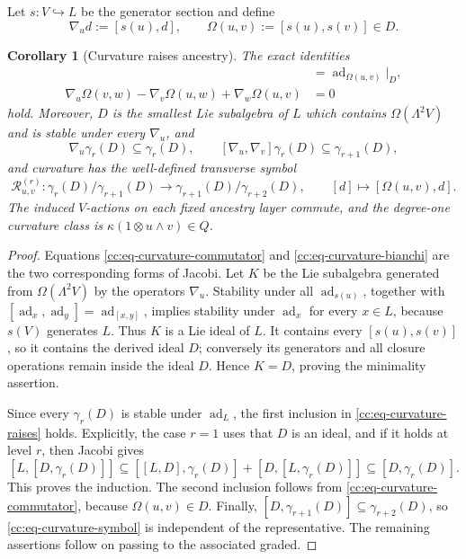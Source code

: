 \documentclass[10pt,reqno]{amsart}
\theoremstyle{plain}
\newtheorem{corollary}[theorem]{Corollary}
\theoremstyle{definition}
\theoremstyle{remark}
\begin{document}
Let \(s:V\hookrightarrow L\) be the generator section and define
\begin{equation}
 \nabla_ud:=[s(u),d],\qquad
 \Omega(u,v):=[s(u),s(v)]\in D.
 \label{cc:eq-connection-curvature}
\end{equation}

\begin{corollary}[Curvature raises ancestry]
\label{cc:prop-curvature}
The exact identities
\begin{align}
 [\nabla_u,\nabla_v]&={\operatorname{ad}}_{\Omega(u,v)}|_D,
 \label{cc:eq-curvature-commutator}\\
 \nabla_u\Omega(v,w)-\nabla_v\Omega(u,w)+\nabla_w\Omega(u,v)&=0
 \label{cc:eq-curvature-bianchi}
\end{align}
hold.  Moreover,
\(D\) is the smallest Lie subalgebra of \(L\) which contains
\(\Omega(\Lambda^2V)\) and is stable under every \(\nabla_u\), and
\begin{equation}
 \nabla_u\gamma_r(D)\subseteq\gamma_r(D),\qquad
 [\nabla_u,\nabla_v]\gamma_r(D)\subseteq\gamma_{r+1}(D),
 \label{cc:eq-curvature-raises}
\end{equation}
and curvature has the well-defined transverse symbol
\begin{equation}
 \mathcal R^{(r)}_{u,v}:
 \gamma_r(D)/\gamma_{r+1}(D)\longrightarrow
 \gamma_{r+1}(D)/\gamma_{r+2}(D),
 \qquad[d]\longmapsto[\Omega(u,v),d].
 \label{cc:eq-curvature-symbol}
\end{equation}
The induced \(V\)-actions on each fixed ancestry layer commute, and the
degree-one curvature class is
\(\kappa(1\otimes u\wedge v)\in Q\).
\end{corollary}

\begin{proof}
Equations \eqref{cc:eq-curvature-commutator} and
\eqref{cc:eq-curvature-bianchi} are the two corresponding forms of
Jacobi.  Let \(K\) be the Lie subalgebra generated from
\(\Omega(\Lambda^2V)\) by the operators \(\nabla_u\).  Stability under
all \({\operatorname{ad}}_{s(u)}\), together with
\([{\operatorname{ad}}_x,{\operatorname{ad}}_y]={\operatorname{ad}}_{[x,y]}\), implies stability under \({\operatorname{ad}}_x\) for
every \(x\in L\), because \(s(V)\) generates \(L\).  Thus \(K\) is a
Lie ideal of \(L\).  It contains every \([s(u),s(v)]\), so it contains
the derived ideal \(D\); conversely its generators and all closure
operations remain inside the ideal \(D\).  Hence \(K=D\), proving the
minimality assertion.

Since every \(\gamma_r(D)\) is stable under \({\operatorname{ad}}_L\), the first
inclusion in \eqref{cc:eq-curvature-raises} holds.  Explicitly, the
case \(r=1\) uses that \(D\) is an ideal, and if it holds at level \(r\),
then Jacobi gives
\[
 [L,[D,\gamma_r(D)]]
 \subseteq[[L,D],\gamma_r(D)]+[D,[L,\gamma_r(D)]]
 \subseteq[D,\gamma_r(D)].
\]
This proves the induction.  The second inclusion follows
from \eqref{cc:eq-curvature-commutator}, because
\(\Omega(u,v)\in D\).  Finally,
\([D,\gamma_{r+1}(D)]\subseteq\gamma_{r+2}(D)\), so
\eqref{cc:eq-curvature-symbol} is independent of the representative.
The remaining assertions follow on passing to the associated graded.
\end{proof}
\end{document}
